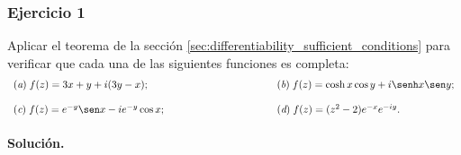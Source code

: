 \documentclass[a4paper]{report}
\begin{document}
\subsubsection{Ejercicio 1}

Aplicar el teorema de la sección \ref{sec:differentiability_sufficient_conditions} para verificar que cada una de las siguientes funciones es completa:
\[
 \begin{array}{ll}
  (\textit{a})\;f(z)=3x+y+i(3y-x);\qquad\qquad\qquad\qquad\qquad&(\textit{b})\;f(z)=\cosh x\cos y+i\senh x\sen y;\\[\bigskipamount]
  (\textit{c})\;f(z)=e^{-y}\sen x-ie^{-y}\cos x;\qquad\qquad\qquad\qquad\qquad&(\textit{d})\;f(z)=(z^2-2)e^{-x}e^{-iy}.
 \end{array}
\]

\paragraph{Solución.} 
\end{document}
